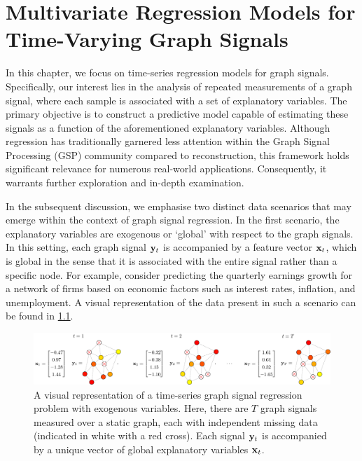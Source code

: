 \chapter{Multivariate Regression Models for Time-Varying Graph Signals}


\label{chap:kgr_rnc_2d}

In this chapter, we focus on time-series regression models for graph signals. Specifically, our interest lies in the analysis of repeated measurements of a graph signal, where each sample is associated with a set of explanatory variables. The primary objective is to construct a predictive model capable of estimating these signals as a function of the aforementioned explanatory variables. Although regression has traditionally garnered less attention within the Graph Signal Processing (GSP) community compared to reconstruction, this framework holds significant relevance for numerous real-world applications. Consequently, it warrants further exploration and in-depth examination.

In the subsequent discussion, we emphasise two distinct data scenarios that may emerge within the context of graph signal regression. In the first scenario, the explanatory variables are exogenous or `global' with respect to the graph signals. In this setting, each graph signal $\mathbf{y}_t$ is accompanied by a feature vector $\mathbf{x}_t$, which is global in the sense that it is associated with the entire signal rather than a specific node. For example, consider predicting the quarterly earnings growth for a network of firms based on economic factors such as interest rates, inflation, and unemployment. A visual representation of the data present in such a scenario can be found in \cref{fig:KGR_diagram}.


\begin{figure}[ht]
    \centering
    \includegraphics[width=\linewidth]{Figures/exogenous.pdf}
    \caption[Graph signal regression with exogenous variables]{A visual representation of a time-series graph signal regression problem with exogenous variables. Here, there are $T$ graph signals measured over a static graph, each with independent missing data (indicated in white with a red cross). Each signal $\mathbf{y}_t$ is accompanied by a unique vector of global explanatory variables $\mathbf{x}_t$. }
    \label{fig:KGR_diagram}
\end{figure}

